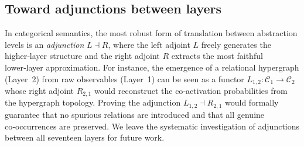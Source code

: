 \subsection{Toward adjunctions between layers}
In categorical semantics, the most robust form of translation between abstraction levels is an \emph{adjunction} $L \dashv R$, where the left adjoint $L$ freely generates the higher‑layer structure and the right adjoint $R$ extracts the most faithful lower‑layer approximation.
For instance, the emergence of a relational hypergraph (Layer~2) from raw observables (Layer~1) can be seen as a functor $L_{1,2} : \mathcal{C}_1 \to \mathcal{C}_2$ whose right adjoint $R_{2,1}$ would reconstruct the co‑activation probabilities from the hypergraph topology.
Proving the adjunction $L_{1,2} \dashv R_{2,1}$ would formally guarantee that no spurious relations are introduced and that all genuine co‑occurrences are preserved.
We leave the systematic investigation of adjunctions between all seventeen layers for future work.